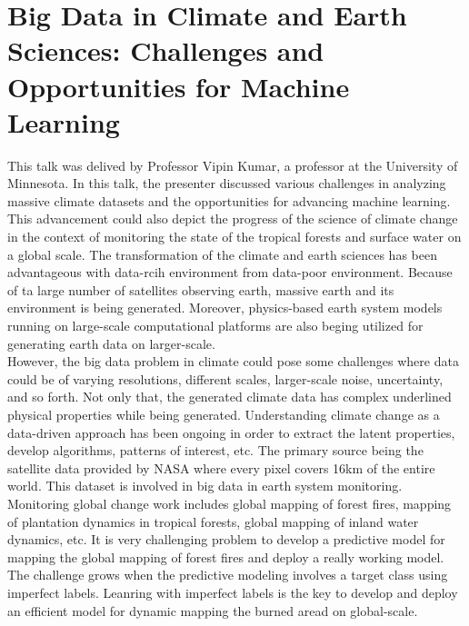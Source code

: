 \documentclass{report}
\begin{document}
\newpage


\section{Big Data in Climate and Earth Sciences: Challenges and Opportunities for Machine Learning}
This talk was delived by Professor Vipin Kumar, a professor at the University of Minnesota. In this talk, the presenter discussed various challenges in analyzing massive climate datasets and the opportunities for advancing machine learning. This advancement could also depict the progress of the science of climate change in the context of monitoring the state of the tropical forests and surface water on a global scale. The transformation of the climate and earth sciences has been advantageous with data-rcih environment from data-poor environment. Because of ta large number of satellites observing earth, massive earth and its environment is being generated. Moreover, physics-based earth system models running on large-scale computational platforms are also beging utilized for generating earth data on larger-scale.\\

However, the big data problem in climate could pose some challenges where data could be of varying resolutions, different scales, larger-scale noise, uncertainty, and so forth. Not only that, the generated climate data has complex underlined physical properties while being generated. Understanding climate change as a data-driven approach has been ongoing in order to extract the latent properties, develop algorithms, patterns of interest, etc. The primary source being the satellite data provided by NASA where every pixel covers 16km of the entire world. This dataset is involved in big data in earth system monitoring. Monitoring global change work includes global mapping of forest fires, mapping of plantation dynamics in tropical forests, global mapping of inland water dynamics, etc. It is very challenging problem to develop a predictive model for mapping the global mapping of forest fires and deploy a really working model. The challenge grows when the predictive modeling involves a target class using imperfect labels. Leanring with imperfect labels is the key to develop and deploy an efficient model for dynamic mapping the burned aread on global-scale.   

\newpage
\end{document}
